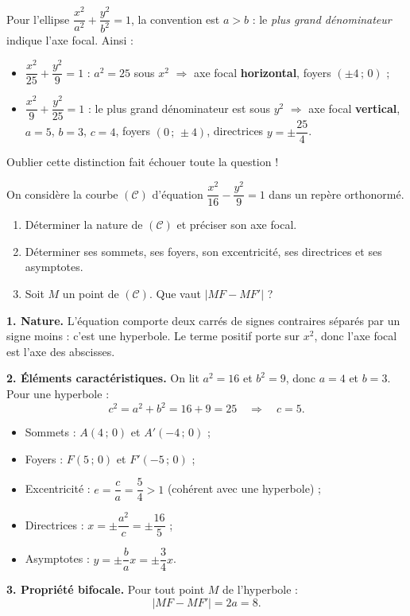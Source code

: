 \documentclass[11pt]{article}
\newcommand{\cle}[1]{{\popxbold\color{popdark}#1}}
\begin{document}
\begin{attention}
Pour l'ellipse $\dfrac{x^2}{a^2} + \dfrac{y^2}{b^2} = 1$, la convention est $a > b$ : le \emph{plus grand dénominateur} indique l'axe focal. Ainsi :
\begin{itemize}
\item $\dfrac{x^2}{25} + \dfrac{y^2}{9} = 1$ : $a^2 = 25$ sous $x^2$ $\Rightarrow$ axe focal \textbf{horizontal}, foyers $(\pm 4\,;\,0)$ ;
\item $\dfrac{x^2}{9} + \dfrac{y^2}{25} = 1$ : le plus grand dénominateur est sous $y^2$ $\Rightarrow$ axe focal \textbf{vertical}, $a = 5$, $b = 3$, $c = 4$, foyers $(0\,;\,\pm 4)$, directrices $y = \pm \dfrac{25}{4}$.
\end{itemize}
Oublier cette distinction fait échouer toute la question !
\end{attention}

\begin{exoresolu}
On considère la courbe $(\mathcal{C})$ d'équation $\dfrac{x^2}{16} - \dfrac{y^2}{9} = 1$ dans un repère orthonormé.
\begin{enumerate}
\item Déterminer la nature de $(\mathcal{C})$ et préciser son axe focal.
\item Déterminer ses sommets, ses foyers, son excentricité, ses directrices et ses asymptotes.
\item Soit $M$ un point de $(\mathcal{C})$. Que vaut $|MF - MF'|$ ?
\end{enumerate}
\tcblower
\textbf{1. Nature.} L'équation comporte deux carrés de signes contraires séparés par un signe moins : c'est une \cle{hyperbole}. Le terme positif porte sur $x^2$, donc l'axe focal est l'axe des abscisses.

\textbf{2. Éléments caractéristiques.} On lit $a^2 = 16$ et $b^2 = 9$, donc $a = 4$ et $b = 3$. Pour une hyperbole :
\[ c^2 = a^2 + b^2 = 16 + 9 = 25 \quad\Longrightarrow\quad c = 5. \]
\begin{itemize}
\item Sommets : $A(4\,;\,0)$ et $A'(-4\,;\,0)$ ;
\item Foyers : $F(5\,;\,0)$ et $F'(-5\,;\,0)$ ;
\item Excentricité : $e = \dfrac{c}{a} = \dfrac{5}{4} > 1$ (cohérent avec une hyperbole) ;
\item Directrices : $x = \pm \dfrac{a^2}{c} = \pm \dfrac{16}{5}$ ;
\item Asymptotes : $y = \pm \dfrac{b}{a}x = \pm \dfrac{3}{4}x$.
\end{itemize}

\textbf{3. Propriété bifocale.} Pour tout point $M$ de l'hyperbole :
\[ |MF - MF'| = 2a = 8. \]
\end{exoresolu}
\end{document}
